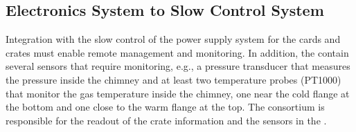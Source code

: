 \subsection{Electronics System to Slow Control System}
\label{ssec:dp-tpcelec-intfc-sc}

Integration with the slow control of the  power supply system for the  cards and  crates %
must enable remote management and monitoring. In addition, the  contain several sensors that require monitoring, e.g.,  %
a pressure transducer that measures the pressure inside the chimney and at least two temperature probes (PT1000) that monitor the gas temperature inside the chimney, one near the cold flange at the bottom and one close to the warm flange at the top. The  consortium is responsible for the readout of the  crate information and the sensors in the . %
